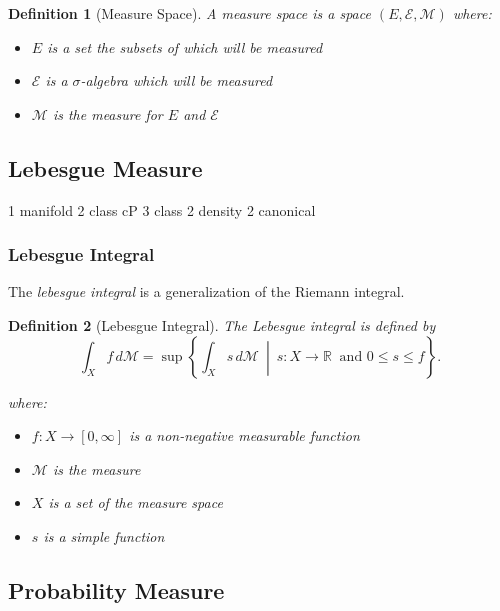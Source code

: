 \documentclass{article}
\newtheorem{definition}{Definition}
\begin{document}
\begin{mdframed}
\begin{definition}[Measure Space]
A \emph{measure space} is a space $(E, \mathcal{E}, \mathcal{M} )$ where:
\begin{itemize}
    \item $E$ is a set the subsets of which will be measured
    \item $\mathcal{E}$ is a $\sigma$-algebra which will be measured
    \item $\mathcal{M}$ is the measure for $E$ and $\mathcal{E}$ 
\end{itemize}
\end{definition}
\end{mdframed}



\subsection{Lebesgue Measure}

1 manifold
2 class cP
3 class
2 density
2 canonical

\subsubsection{Lebesgue Integral}

The \emph{lebesgue integral} is a generalization of the Riemann integral.



\begin{mdframed}
\begin{definition}[Lebesgue Integral]
The \emph{Lebesgue integral} is defined by
$$
\int_X f \, d \mathcal{M} = \sup \left\{ \int_X s \, d \mathcal{M} \ \middle|\ s : X \to \mathbb{R} \ \text{ and } 0 \le s \le f \right\}.
$$

where:
\begin{itemize}
    \item $f: X \rightarrow [0,\infty]$ is a non-negative measurable function
    \item $\mathcal{M}$ is the measure
    \item $X$ is a set of the measure space
    \item $s$ is a simple function
\end{itemize}
\end{definition}
\end{mdframed}




\subsection{Probability Measure}
\end{document}
